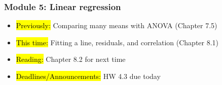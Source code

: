 
\begin{frame}
    \frametitle{Module 5: Linear regression}
    \begin{itemize}
        \item \hl{Previously: }Comparing many means with ANOVA (Chapter 7.5)
        \item \hl{This time: }Fitting a line, residuals, and correlation (Chapter 8.1)
        \item \hl{Reading: }Chapter 8.2 for next time
        \item \hl{Deadlines/Announcements: }HW 4.3 due today
    \end{itemize}
    
\end{frame}